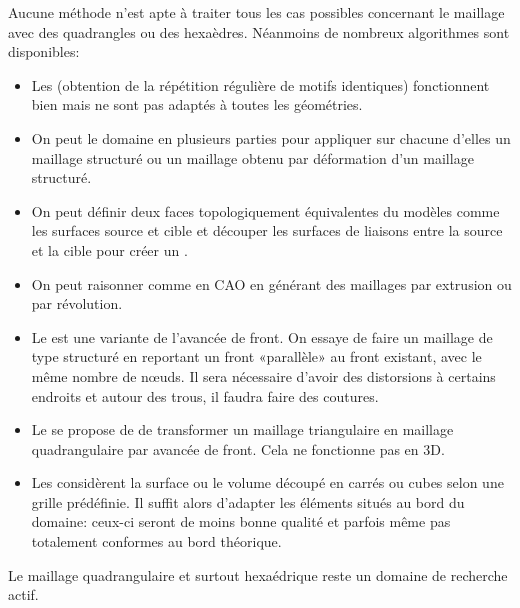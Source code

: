 \medskip
Aucune méthode n'est apte à traiter tous les cas possibles concernant le maillage avec des quadrangles ou des hexaèdres. Néanmoins de nombreux algorithmes sont disponibles:
\begin{itemize}
   \item Les  (obtention de la répétition régulière de motifs identiques) fonctionnent bien mais ne sont pas adaptés à toutes les géométries.
   \item On peut  le domaine en plusieurs parties pour appliquer sur chacune d'elles un maillage structuré ou un maillage obtenu par déformation d'un maillage structuré.
   \item On peut définir deux faces topologiquement équivalentes du modèles comme les surfaces source et cible et découper les surfaces de liaisons entre la source et la cible pour créer un .
   \item On peut raisonner comme en CAO en générant des maillages par extrusion ou par révolution.
   \item Le  est une variante de l'avancée de front. On essaye de faire un maillage de type structuré en reportant un front «parallèle» au front existant, avec le même nombre de nœuds. Il sera nécessaire d'avoir des distorsions  à certains endroits et autour des trous, il faudra faire des coutures.
   \item Le  se propose de de transformer un maillage triangulaire en maillage quadrangulaire par avancée de front. Cela ne fonctionne pas en 3D.
   \item Les  considèrent la surface ou le volume découpé en carrés ou cubes selon une grille prédéfinie. Il suffit alors d'adapter les éléments situés au bord du domaine: ceux-ci seront de moins bonne qualité et parfois même pas totalement conformes au bord théorique.
\end{itemize}
Le maillage quadrangulaire et surtout hexaédrique reste un domaine de recherche actif.
